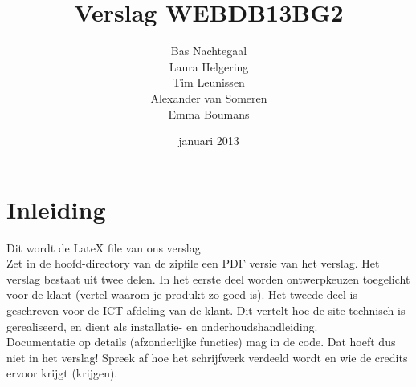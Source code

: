 \documentclass{article}
\begin{document}
\title{Verslag WEBDB13BG2}
\author{Bas Nachtegaal\\
    Laura Helgering\\
    Tim Leunissen\\
    Alexander van Someren\\
    Emma Boumans}
\date{januari 2013}
\maketitle

\begin{comment}
Dit is een comment waarin we de voortgang van het verslag kunnen bijhouden. Als je iets update, is het handig als je dat hier even bij zet. Ik (Emma) ben zojuist begonnen aan het verslag.
\end{comment}

\section{Inleiding}
Dit wordt de LateX file van ons verslag\\
Zet in de hoofd-directory van de zipfile een PDF versie van het verslag. Het verslag bestaat uit twee delen. In het eerste deel worden ontwerpkeuzen toegelicht voor de klant (vertel waarom je produkt zo goed is). Het tweede deel is geschreven voor de ICT-afdeling van de klant. Dit vertelt hoe de site technisch is gerealiseerd, en dient als installatie- en onderhoudshandleiding. \\
Documentatie op details (afzonderlijke functies) mag in de code. Dat hoeft dus niet in het verslag! Spreek af hoe het schrijfwerk verdeeld wordt en wie de credits ervoor krijgt (krijgen). 
\end{document}
